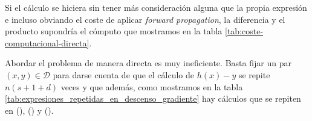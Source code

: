 Si el cálculo se hiciera sin tener más consideración alguna que la propia expresión e incluso obviando el coste de aplicar \textit{forward propagation}, la diferencia y el producto
supondría el cómputo que mostramos en la tabla \ref{tab:coste-computacional-directa}.

\begin{table}[H]
    \begin{center}
    \caption{Coste computacional de aplicar directamente el  algoritmo de gradiente 
    descendente para actualizar $h \in \mathcal{H}_n(\R^d, \R^s)$}
    \label{tab:coste-computacional-directa}
    \end{center}
\end{table}

Abordar el problema de manera directa es muy ineficiente. Basta fijar un par $(x,y) \in \mathcal{D}$ para darse cuenta de que el cálculo de $h(x)-y$ se repite $n(s+1+d)$ veces y que además,  como mostramos en la tabla 
\ref{tab:expresiones_repetidas_en_descenso_gradiente}
hay cálculos que se repiten en (), () y  
(). 

